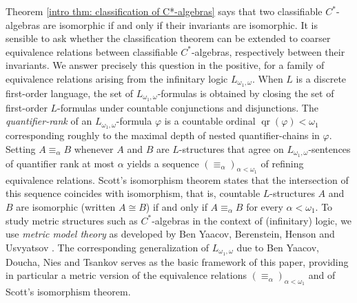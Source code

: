 \documentclass[12pt]{amsart}
\DeclareMathOperator{\qr}{qr}
\begin{document}
Theorem \ref{intro thm: classification of C*-algebras} says that two classifiable $C^*$-algebras are isomorphic if and only if their invariants are isomorphic.
It is sensible to ask whether the classification theorem can be extended to coarser equivalence relations between classifiable $C^*$-algebras, respectively between their invariants. We answer precisely this question in the positive, for a family of equivalence relations arising from the infinitary logic $L_{\omega_1, \omega}$.
When $L$ is a discrete first-order language, the set of $L_{\omega_1, \omega}$-formulas is obtained by closing the set of first-order $L$-formulas under countable conjunctions and disjunctions. The \emph{quantifier-rank} of an $L_{\omega_1, \omega}$-formula $\varphi$ is a countable ordinal $\qr(\varphi)<\omega_1$ corresponding roughly to the maximal depth of nested quantifier-chains in $\varphi$. Setting $A\equiv_\alpha B$ whenever $A$ and $B$ are $L$-structures that agree on $L_{\omega_1, \omega}$-sentences of quantifier rank at most $\alpha$ yields a sequence $(\equiv_\alpha)_{\alpha<\omega_1}$ of refining equivalence relations. Scott's isomorphism theorem \cite{Scott1965-SCOLWD} states that the intersection of this sequence coincides with isomorphism, that is, countable $L$-structures $A$ and $B$ are isomorphic (written $A\cong B$) if and only if $A\equiv_\alpha B$ for every $\alpha<\omega_1$.
To study metric structures such as $C^*$-algebras in the context of (infinitary) logic, we use \emph{metric model theory} as developed by Ben Yaacov, Berenstein, Henson and Usvyatsov  \cite{MR2436146}. The corresponding generalization of $L_{\omega_1, \omega}$ due to Ben Yaacov, Doucha, Nies and Tsankov \cite{yaacov2017metric} serves as the basic framework of this paper, providing in particular a metric version of the equivalence relations $(\equiv_\alpha)_{\alpha<\omega_1}$ and of Scott's isomorphism theorem.
\end{document}

